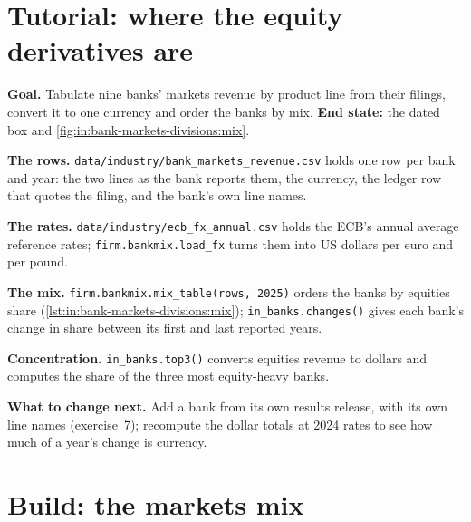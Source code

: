 \section{Tutorial: where the equity derivatives are}\label{tut:in:bank-markets-divisions:tut}

\begin{tutorial}
\textbf{Goal.} Tabulate nine banks' markets revenue by product line from their filings, convert it to one currency and
order the banks by mix. \textbf{End state:} the dated box and \cref{fig:in:bank-markets-divisions:mix}.
\begin{tutsteps}
\item \textbf{The rows.} \texttt{data/industry/bank\_markets\_revenue.csv} holds one row per bank and year: the two
lines as the bank reports them, the currency, the ledger row that quotes the filing, and the bank's own line names.
\item \textbf{The rates.} \texttt{data/industry/ecb\_fx\_annual.csv} holds the ECB's annual average reference rates;
\texttt{firm.bankmix.load\_fx} turns them into US dollars per euro and per pound.
\item \textbf{The mix.} \texttt{firm.bankmix.mix\_table(rows, 2025)} orders the banks by equities share
(\cref{lst:in:bank-markets-divisions:mix}); \texttt{in\_banks.changes()} gives each bank's change in share between its
first and last reported years.
\label{lst:in:bank-markets-divisions:mix}
\item \textbf{Concentration.} \texttt{in\_banks.top3()} converts equities revenue to dollars and computes the share of
the three most equity-heavy banks.
\end{tutsteps}
\end{tutorial}

\textbf{What to change next.} Add a bank from its own results release, with its own line names (exercise~7); recompute
the dollar totals at 2024 rates to see how much of a year's change is currency.

\section{Build: the markets mix}\label{bld:in:bank-markets-divisions:bankmix}

